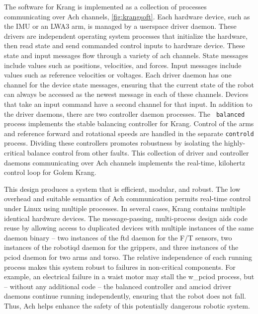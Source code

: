 \documentclass[letterpaper]{IEEEtran}
\begin{document}
The software for Krang is implemented as a collection of processes
communicating over Ach channels, \autoref{fig:krangsoft}.  Each
hardware device, such as the IMU or an LWA3 arm, is managed by a
userspace driver daemon.  These drivers are independent operating
system processes that initialize the hardware, then read state and
send commanded control inputs to hardware device.  These state and
input messages flow through a variety of ach channels.  State messages
include values such as positions, velocities, and forces.  Input
messages include values such as reference velocities or voltages. Each
driver daemon has one channel for the device state messages, ensuring
that the current state of the robot can always be accessed as the
newest message in each of these channels.  Devices that take an input
command have a second channel for that input.  In addition to the
driver daemons, there are two controller daemon processes.  The {\tt
  balanced} process implements the stable balancing controller for
Krang.  Control of the arms and reference forward and rotational
speeds are handled in the separate {\tt controld} process.  Dividing
these controllers promotes robustness by isolating the highly-critical
balance control from other faults.  This collection of driver and
controller daemons communicating over Ach channels implements the
real-time, kilohertz control loop for Golem Krang.

This design produces a system that is efficient, modular, and robust.
The low overhead and suitable semantics of Ach communication permits
real-time control under Linux using multiple processes. In several
cases, Krang contains multiple identical hardware devices.  The
message-passing, multi-process design aids code reuse by allowing
access to duplicated devices with multiple instances of the same
daemon binary -- two instances of the ftd daemon for the F/T sensors,
two instances of the robotiqd daemon for the grippers, and three
instances of the pciod daemon for two arms and torso.  The relative
independence of each running process makes this system robust to
failures in non-critical components.  For example, an electrical
failure in a waist motor may stall the w\_pciod process, but --
without any additional code -- the balanced controller and amciod
driver daemons continue running independently, ensuring that the robot
does not fall.  Thus, Ach helps enhance the safety of this potentially
dangerous robotic system.



\end{document}
